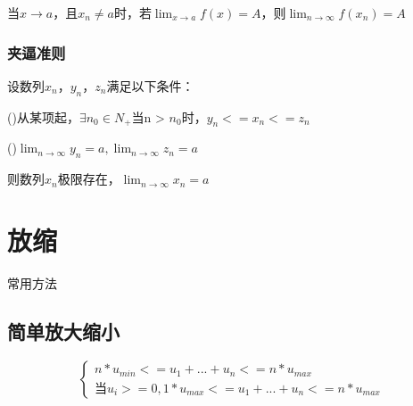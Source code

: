 当\(x \to a\)，且\(x_n \neq a\)时，若\(\displaystyle \lim_{x \to a}f(x) = A\)，则\(\displaystyle \lim_{n \to \infty}f(x_n) = A\)

\subsubsection{夹逼准则}

设数列{\(x_n\)}，{\(y_n\)}，{\(z_n\)}满足以下条件：

()从某项起，\(\exists n_0 \in N_+\)当n > \(n_0\)时，\(y_n <= x_n <= z_n\)

()\(\displaystyle \lim_{n \to \infty}y_n = a, \displaystyle \lim_{n \to \infty}z_n = a\)

则数列{\(x_n\)}极限存在，\(\displaystyle \lim_{n \to \infty}x_n = a\)

\section{放缩}
常用方法

\subsection{简单放大缩小}
\[
\begin{cases}
n * u_{min} <= u_1 + ... + u_n <= n * u_{max} \\ 
\text{当}u_i >= 0, 1 * u_{max} <= u_1 + ... + u_n <= n * u_{max}
\end{cases}
\]

